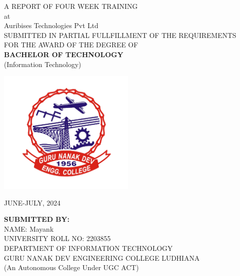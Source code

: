 \documentclass[12pt,a4paper]{report}
\title{}
\date{}
\begin{document}
\centering
{\large
    A REPORT OF FOUR WEEK TRAINING\\at\\Auribises Technologies Pvt Ltd\\
}
\vspace{0.8cm}
{
\normalsize
SUBMITTED IN PARTIAL FULLFILLMENT OF THE REQUIREMENTS FOR THE AWARD OF THE DEGREE OF\\\vspace{0.8cm}
{\large \textbf{BACHELOR OF TECHNOLOGY}\\(Information Technology)}
}

\vspace{1cm}
    \includegraphics[width=0.50\textwidth]{assets/GNE_logo.png} \\ 
    \vspace{1cm}

    {\large JUNE-JULY, 2024}
    \vspace{0.8cm}
    
    \textbf{SUBMITTED BY:}\\
    NAME: Mayank\\
    UNIVERSITY ROLL NO: 2203855\\
    \vspace{0.8cm}
    {DEPARTMENT OF INFORMATION TECHNOLOGY}\\ 
    \vspace{0.2cm}
    {\large GURU NANAK DEV ENGINEERING COLLEGE LUDHIANA}\\
    \vspace{0.2cm}
    (An Autonomous College Under UGC ACT)

\justifying
\newpage
\end{document}
